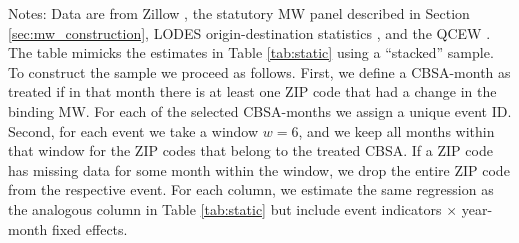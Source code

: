 \begin{table}[hbt!]
    \begin{minipage}{.95\textwidth} \footnotesize
        \vspace{2mm}
        Notes: 
        Data are from Zillow \parencite{ZillowData}, 
        the statutory MW panel described in Section \ref{sec:mw_construction}, 
        LODES origin-destination statistics \parencite{CensusLODES},
        and the QCEW \parencite{QCEW}.
        The table mimicks the estimates in Table \ref{tab:static} using a 
        ``stacked'' sample.
        To construct the sample we proceed as follows.
        First, we define a CBSA-month as treated if in that month there is at 
        least one ZIP code that had a change in the binding MW.
        For each of the selected CBSA-months we assign a unique event ID. 
        Second, for each event we take a window $w = 6$, and we keep all months 
        within that window for the ZIP codes that belong to the treated CBSA.
        If a ZIP code has missing data for some month within the window, we drop 
        the entire ZIP code from the respective event.
        For each column, we estimate the same regression as the analogous column 
        in Table \ref{tab:static} but include event indicators $\times$ year-month
        fixed effects.
    \end{minipage}
\end{table}
